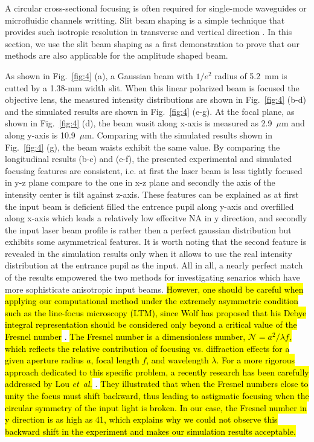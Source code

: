 \documentclass[9pt,twocolumn,twoside]{osajnl}
\begin{document}
A circular cross-sectional focusing is often required for single-mode waveguides or microfluidic channels writting. Slit beam shaping is a simple technique that provides such isotropic resolution in transverse and vertical direction \cite{cheng2003control, ams2005slit}. In this section, we use the slit beam shaping as a first demonstration to prove that our methods are also applicable for the amplitude shaped beam. 

As shown in Fig.~\ref{fig:4} (a), a Gaussian beam with $1/e^2$ radius of 5.2~mm is cutted by a 1.38-mm width slit. When this linear polarized beam is focused the objective lens, the measured intensity distributions are shown in Fig.~\ref{fig:4} (b-d) and the simulated results are shown in Fig.~\ref{fig:4} (e-g). At the focal plane, as shown in Fig.~\ref{fig:4} (d), the beam wasit along x-axis is measured as 2.9~$\mu$m and along y-axis is 10.9~$\mu$m. Comparing with the simulated results shown in Fig.~\ref{fig:4} (g), the beam waists exhibit the same value. By comparing the longitudinal results (b-c) and (e-f), the presented experimental and simulated focusing features are consistent, i.e. at first the laser beam is less tightly focused in y-z plane compare to the one in x-z plane and secondly the axis of the intensity center is tilt against z-axis. These features can be explained as at first the input beam is deficient filled the entrence pupil along y-axis and overfilled along x-axis which leads a relatively low effecitve NA in y direction, and secondly the input laser beam profile is rather then a perfect gaussian distribution but exhibits some asymmetrical features. It is worth noting that the second feature is revealed in the simulation results only when it allows to use the real intensity distribution at the entrance pupil as the input. All in all, a nearly perfect match of the results empowered the two methods for investigating senarios which have more sophisticate anisotropic input beams. \hl{However, one should be careful when applying our computational method under the extremely asymmetric condition such as the line-focus microscopy (LTM), since Wolf has proposed that his Debye integral representation should be considered only beyond a critical value of the Fresnel number} \cite{wolf1981conditions}. \hl{The Fresnel number is a dimensionless number, $\mathcal{N} = a^2/\lambda f$, which reflects the relative contribution of focusing vs. diffraction effects for a given aperture radius $a$, focal length $f$, and wavelength $\lambda$. For a more rigorous approach dedicated to this specific problem, a recently research has been carefully addressed by Lou \emph{et~al.}} \cite{lou2018better}. \hl{They illustrated that when the Fresnel numbers close to unity the focus must shift backward, thus leading to astigmatic focusing when the circular symmetry of the input light is broken. In our case, the Fresnel number in y direction is as high as 41, which explains why we could not observe this backward shift in the experiment and makes our simulation results acceptable.}   
\end{document}
